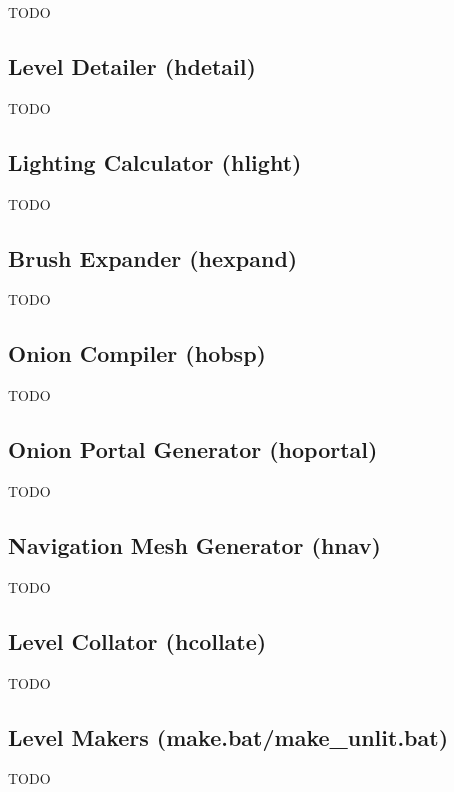 TODO

\subsection{Level Detailer (hdetail)}

TODO

\subsection{Lighting Calculator (hlight)}

TODO

\subsection{Brush Expander (hexpand)}

TODO

\subsection{Onion Compiler (hobsp)}

TODO

\subsection{Onion Portal Generator (hoportal)}

TODO

\subsection{Navigation Mesh Generator (hnav)}

TODO

\subsection{Level Collator (hcollate)}

TODO

\subsection{Level Makers (make.bat/make\_unlit.bat)}

TODO
